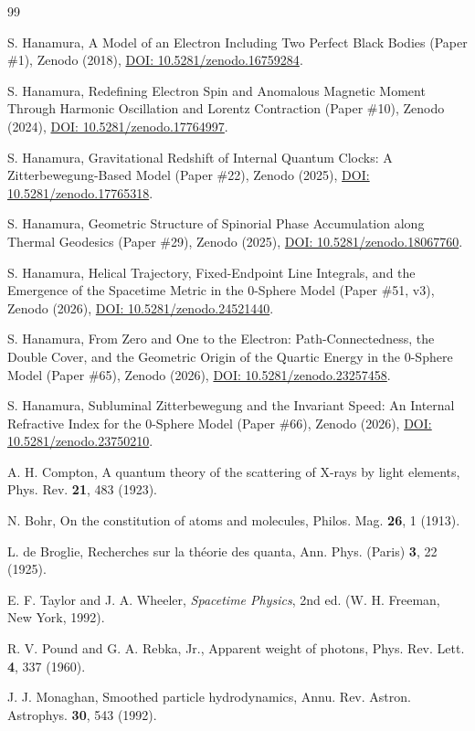 \documentclass[%
 reprint, amsmath,amssymb, aps, prb, ]{revtex4-2}
\numberwithin{equation}{section}
\begin{document}
\begin{thebibliography}{99}

 S. Hanamura, A Model of an Electron Including Two Perfect Black Bodies (Paper \#1), Zenodo (2018), \href{https://doi.org/10.5281/zenodo.16759284}{DOI: 10.5281/zenodo.16759284}.

 S. Hanamura, Redefining Electron Spin and Anomalous Magnetic Moment Through Harmonic Oscillation and Lorentz Contraction (Paper \#10), Zenodo (2024), \href{https://doi.org/10.5281/zenodo.17764997}{DOI: 10.5281/zenodo.17764997}.

 S. Hanamura, Gravitational Redshift of Internal Quantum Clocks: A Zitterbewegung-Based Model (Paper \#22), Zenodo (2025), \href{https://doi.org/10.5281/zenodo.17765318}{DOI: 10.5281/zenodo.17765318}.

 S. Hanamura, Geometric Structure of Spinorial Phase Accumulation along Thermal Geodesics (Paper \#29), Zenodo (2025), \href{https://doi.org/10.5281/zenodo.18067760}{DOI: 10.5281/zenodo.18067760}.

 S. Hanamura, Helical Trajectory, Fixed-Endpoint Line Integrals, and the Emergence of the Spacetime Metric in the 0-Sphere Model (Paper \#51, v3), Zenodo (2026), \href{https://doi.org/10.5281/zenodo.24521440}{DOI: 10.5281/zenodo.24521440}.

 S. Hanamura, From Zero and One to the Electron: Path-Connectedness, the Double Cover, and the Geometric Origin of the Quartic Energy in the 0-Sphere Model (Paper \#65), Zenodo (2026), \href{https://doi.org/10.5281/zenodo.23257458}{DOI: 10.5281/zenodo.23257458}.

 S. Hanamura, Subluminal Zitterbewegung and the Invariant Speed: An Internal Refractive Index for the 0-Sphere Model (Paper \#66), Zenodo (2026), \href{https://doi.org/10.5281/zenodo.23750210}{DOI: 10.5281/zenodo.23750210}.

 A. H. Compton, A quantum theory of the scattering of X-rays by light elements, Phys. Rev. \textbf{21}, 483 (1923).

 N. Bohr, On the constitution of atoms and molecules, Philos. Mag. \textbf{26}, 1 (1913).

 L. de Broglie, Recherches sur la th\'eorie des quanta, Ann. Phys. (Paris) \textbf{3}, 22 (1925).

 E. F. Taylor and J. A. Wheeler, \emph{Spacetime Physics}, 2nd ed. (W. H. Freeman, New York, 1992).

 R. V. Pound and G. A. Rebka, Jr., Apparent weight of photons, Phys. Rev. Lett. \textbf{4}, 337 (1960).

 J. J. Monaghan, Smoothed particle hydrodynamics, Annu. Rev. Astron. Astrophys. \textbf{30}, 543 (1992).

\end{thebibliography}
\end{document}
